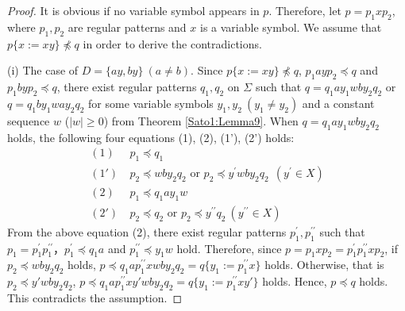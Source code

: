 \begin{proof}
It is obvious if no variable symbol appears in $p$. 
Therefore, let $p=p_{1}xp_{2}$, where $p_{1}, p_{2}$ are regular patterns and $x$ is a variable symbol.
We assume that $p \{ x := xy \} \not \preceq q$ in order to derive the contradictions.

\noindent
(i) 
The case of $D=\{ ay, by \} \ (a \ne b)$.
\noindent
Since $p \{ x := xy \} \not \preceq q$, $p_{1}ayp_{2}\preceq q$ and $p_{1}byp_{2}\preceq q$, 
there exist regular patterns $q_{1},q_{2}$ on $\Sigma$ such that $q=q_{1}ay_{1}wby_{2}q_{2}$ or $q=q_{1}by_{1}way_{2}q_{2}$ for some variable symbols $y_{1},y_{2}~(y_{1} \not= y_{2})$ and a constant sequence $w$ ($|w|\geq 0$) from Theorem \ref{Sato1:Lemma9}.
When $q=q_{1}ay_{1}wby_{2}q_{2}$ holds, the following four equations (1), (2), (1'), (2') holds:
\begin{align*}
(1) & ~p_{1} \preceq q_{1}\\
(1') & ~p_{2} \preceq wby_{2}q_{2} \mbox{ or } p_{2} \preceq y^{\prime}wby_{2}q_{2} ~~(y^{\prime} \in X)\\
(2) & ~p_{1} \preceq q_{1}ay_{1}w\\
(2') & ~p_{2} \preceq q_{2} \mbox{ or } p_{2} \preceq y^{\prime\prime}q_{2} ~(y^{\prime\prime} \in X)
\end{align*}
From the above equation (2), there exist regular patterns $p_{1}^{\prime},p_{1}^{\prime\prime}$ such that $p_{1}=p_{1}^{\prime}p_{1}^{\prime\prime}$，$p_{1}^{\prime} \preceq q_{1}a$ and $p_{1}^{\prime\prime} \preceq y_{1}w$ hold.
Therefore, since $p=p_{1}xp_{2}=p_{1}^{\prime}p_{1}^{\prime\prime}xp_{2}$,
if $p_{2} \preceq wby_{2}q_{2}$ holds, 
$p\preceq q_{1}ap_{1}^{\prime\prime}xwby_{2}q_{2}=q \{ y_{1} := p_{1}^{\prime\prime}x \}$ holds.
Otherwise, that is $p_2\preceq y'wby_{2}q_{2}$, $p\preceq q_{1}ap_{1}^{\prime\prime}xy'wby_{2}q_{2}=q \{ y_{1} := p_{1}^{\prime\prime}xy' \}$ holds.
Hence, $p \preceq q$ holds.
This contradicts the assumption.


\end{proof}
